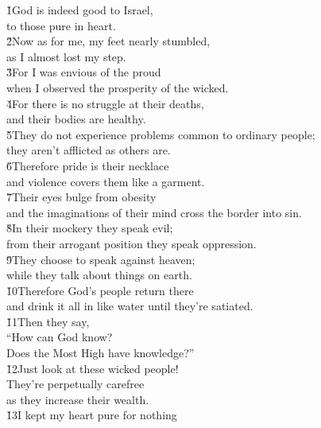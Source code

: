 \begin{poetry}
\poeml \v{1}God is indeed good to Israel, \\
\poemll    to those pure in heart. \\
\poeml \v{2}Now as for me, my feet nearly stumbled, \\
\poemll    as I almost lost my step. \\
\poeml \v{3}For I was envious of the proud \\
\poemll    when I observed the prosperity of the wicked. \\
\poeml \v{4}For there is no struggle at their deaths, \\
\poemll    and their bodies are healthy. \\
\poeml \v{5}They do not experience problems common to ordinary people; \\
\poemll    they aren't afflicted as others are. \\
\poeml \v{6}Therefore pride is their necklace \\
\poemll    and violence covers them like a garment. \\
\poeml \v{7}Their eyes bulge from obesity \\
\poemll    and the imaginations of their mind cross the border into sin. \\
\poeml \v{8}In their mockery they speak evil; \\
\poemll    from their arrogant position they speak oppression. \\
\poeml \v{9}They choose to speak against heaven; \\
\poemll    while they talk about things on earth. \\
\poeml \v{10}Therefore God's people return there \\
\poemll    and drink it all in like water until they're satiated. \\
\poeml \v{11}Then they say, \\
\poemll    ``How can God know? \\
\poemlll       Does the Most High have knowledge?'' \\
\poeml \v{12}Just look at these wicked people! \\
\poemll    They're perpetually carefree \\
\poemlll       as they increase their wealth. \\
\poeml \v{13}I kept my heart pure for nothing \\

\end{poetry}
